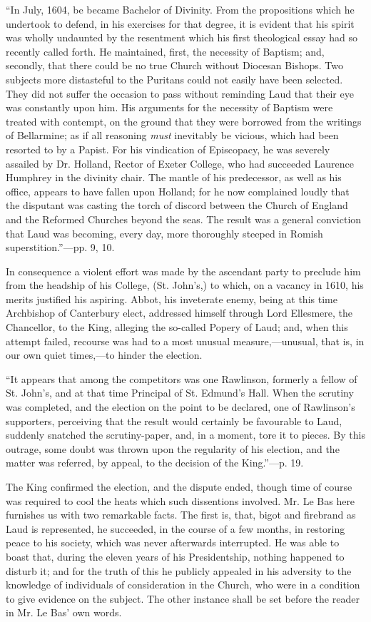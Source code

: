 ``In July, 1604, be became Bachelor
of Divinity. From the propositions which he undertook to defend, in his
exercises for that degree, it is evident that his spirit was wholly
undaunted by the resentment which his first theological essay had so
recently called forth. He maintained, first, the necessity of Baptism;
and, secondly, that there could be no true Church without Diocesan
Bishops. Two subjects more distasteful to the Puritans could not easily
have been selected. They did not suffer the occasion to pass without
reminding Laud that their eye was constantly upon
him. His arguments for the necessity of Baptism were treated with
contempt, on the ground that they were borrowed from the writings of
Bellarmine; as if all reasoning \emph{must} inevitably be vicious, which
had been resorted to by a Papist. For his vindication of Episcopacy, he
was severely assailed by Dr. Holland, Rector of Exeter College, who had
succeeded Laurence Humphrey in the divinity chair. The mantle of his
predecessor, as well as his office, appears to have fallen upon Holland;
for he now complained loudly that the disputant was casting the torch of
discord between the Church of England and the Reformed Churches beyond
the seas. The result was a general conviction that Laud was becoming,
every day, more thoroughly steeped in Romish superstition.''—pp. 9, 10.

In consequence a violent effort was made by the
ascendant party to preclude him from the headship of his College, (St.
John's,) to which, on a vacancy in 1610, his merits justified his
aspiring. Abbot, his inveterate enemy, being at this time Archbishop of
Canterbury elect, addressed himself through Lord Ellesmere, the
Chancellor, to the King, alleging the so-called Popery of Laud; and,
when this attempt failed, recourse was had to a most unusual
measure,—unusual, that is, in our own quiet times,—to hinder the
election.

``It appears that among the
competitors was one Rawlinson, formerly a fellow of St. John's, and at
that time Principal of St. Edmund's Hall. When the scrutiny was
completed, and the election on the point to be declared, one of
Rawlinson's supporters, perceiving that the result would certainly be
favourable to Laud, suddenly snatched the scrutiny-paper, and, in a
moment, tore it to pieces. By this outrage, some doubt was thrown upon
the regularity of his election, and the matter was referred, by appeal,
to the decision of the King.''—p. 19.

The King confirmed the election, and the dispute
ended, though time of course was required to cool the heats which such
dissentions involved. Mr. Le Bas here furnishes us with two remarkable
facts. The first is, that, bigot and firebrand as Laud is represented,
he succeeded, in the course of a few months, in restoring peace to his
society, which was never afterwards interrupted. He was able to boast
that, during the eleven years of his Presidentship, nothing happened to
disturb it; and for the truth of this he publicly appealed in his
adversity to the knowledge of individuals of consideration in the
Church, who were in a condition to give evidence on the subject. The
other instance shall be set before the reader in Mr. Le Bas' own words.

